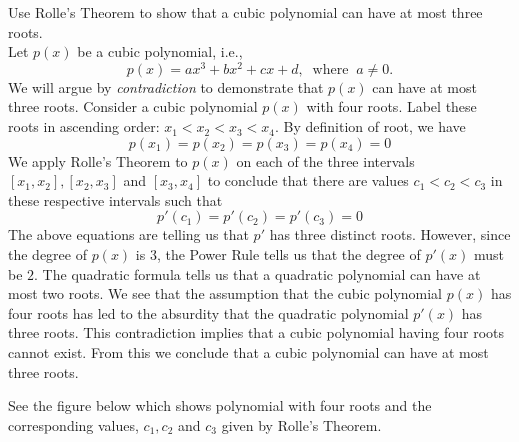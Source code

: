 \documentclass[handout]{ximera}
\begin{document}
\begin{example}[example 2] Use Rolle's Theorem  to show that a cubic polynomial can have at most three roots.\\

Let $p(x)$ be a cubic polynomial, i.e., 
\[
p(x) = ax^3 + bx^2 + cx + d, \;\; \text{where} \;\; a\neq 0.
\]
We will argue by {\it contradiction} to demonstrate that $p(x)$ can have at most three roots.
Consider a cubic polynomial $p(x)$ with four roots.
Label these roots in ascending order: $x_1 <  x_2 < x_3 < x_4$.
By definition of root, we have
\[
p(x_1) = p(x_2) = p(x_3) = p(x_4) = 0
\]
We apply Rolle's Theorem to $p(x)$ on each of the three intervals $[x_1, x_2], [x_2, x_3]$ and $[x_3, x_4]$ to conclude that 
there are values $c_1 < c_2 < c_3$ in these respective intervals such that
\[
p'(c_1) = p'(c_2) = p'(c_3) = 0
\]
The above equations are telling us that $p'$ has three distinct roots.
However, since the degree of $p(x)$ is $3$, the Power Rule tells us that the degree of $p'(x)$ must be $2$.
The quadratic formula tells us that a quadratic polynomial can have at most two roots.
We see that the assumption that the cubic polynomial $p(x)$ has four roots has led to the absurdity that 
the quadratic polynomial $p'(x)$ has three roots.
This contradiction implies that a cubic polynomial having four roots cannot exist.
From this we conclude that a cubic polynomial can have at most three roots.

See the figure below which shows polynomial with four roots and the corresponding values, $c_1, c_2$ and $c_3$ given by Rolle's Theorem.

\begin{image}
\end{image}

\end{example}
\end{document}
